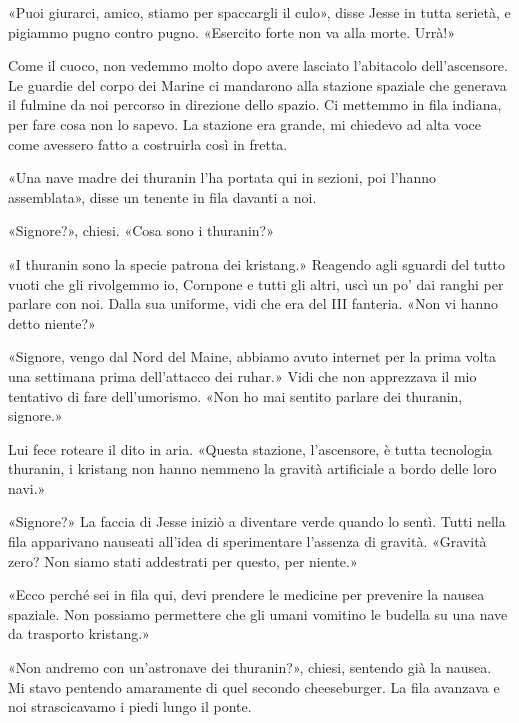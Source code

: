«Puoi giurarci, amico, stiamo per spaccargli il culo», disse Jesse in
tutta serietà, e pigiammo pugno contro pugno. «Esercito forte non va
alla morte. Urrà!»

\hfill\break

Come il cuoco, non vedemmo molto dopo avere lasciato l'abitacolo
dell'ascensore. Le guardie del corpo dei Marine ci mandarono alla
stazione spaziale che generava il fulmine da noi percorso in direzione
dello spazio. Ci mettemmo in fila indiana, per fare cosa non lo sapevo.
La stazione era grande, mi chiedevo ad alta voce come avessero fatto a
costruirla così in fretta.

«Una nave madre dei thuranin l'ha portata qui in sezioni, poi l'hanno
assemblata», disse un tenente in fila davanti a noi.

«Signore?», chiesi. «Cosa sono i thuranin?»

«I thuranin sono la specie patrona dei kristang.» Reagendo agli sguardi
del tutto vuoti che gli rivolgemmo io, Cornpone e tutti gli altri, uscì
un po' dai ranghi per parlare con noi. Dalla sua uniforme, vidi che era
del III fanteria. «Non vi hanno detto niente?»

«Signore, vengo dal Nord del Maine, abbiamo avuto internet per la prima
volta una settimana prima dell'attacco dei ruhar.» Vidi che non
apprezzava il mio tentativo di fare dell'umorismo. «Non ho mai sentito
parlare dei thuranin, signore.»

Lui fece roteare il dito in aria. «Questa stazione, l'ascensore, è tutta
tecnologia thuranin, i kristang non hanno nemmeno la gravità artificiale
a bordo delle loro navi.»

«Signore?» La faccia di Jesse iniziò a diventare verde quando lo sentì.
Tutti nella fila apparivano nauseati all'idea di sperimentare l'assenza
di gravità. «Gravità zero? Non siamo stati addestrati per questo, per
niente.»

«Ecco perché sei in fila qui, devi prendere le medicine per prevenire la
nausea spaziale. Non possiamo permettere che gli umani vomitino le
budella su una nave da trasporto kristang.»

«Non andremo con un'astronave dei thuranin?», chiesi, sentendo già la
nausea. Mi stavo pentendo amaramente di quel secondo cheeseburger. La
fila avanzava e noi strascicavamo i piedi lungo il ponte.

